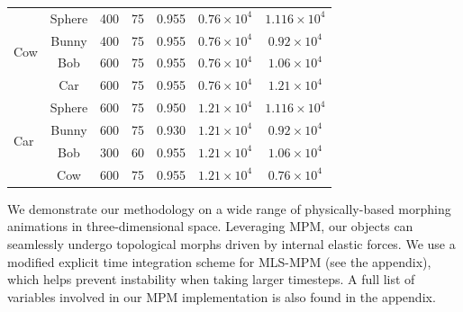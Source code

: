 \begin{table}[!ht]
\begin{tabular}{l c c c c c c}
    \midrule
    \multirow{4}{*}{Cow}
      & Sphere & 400 & 75 & 0.955 & $0.76 \times 10^4$ & $1.116 \times 10^4$ \\
      & Bunny  & 400 & 75 & 0.955 & $0.76 \times 10^4$ & $0.92 \times 10^4$ \\
      & Bob    & 600 & 75 & 0.955 & $0.76 \times 10^4$ & $1.06 \times 10^4$ \\
      & Car    & 600 & 75 & 0.955 & $0.76 \times 10^4$ & $1.21 \times 10^4$ \\
    \midrule
    \multirow{4}{*}{Car}
      & Sphere & 600 & 75 & 0.950 & $1.21 \times 10^4$ & $1.116 \times 10^4$ \\
      & Bunny  & 600 & 75 & 0.930 & $1.21 \times 10^4$ & $0.92 \times 10^4$ \\
      & Bob    & 300 & 60 & 0.955 & $1.21 \times 10^4$ & $1.06 \times 10^4$ \\
      & Cow   & 600 & 75 & 0.955 & $1.21 \times 10^4$ & $0.76 \times 10^4$ \\
    \bottomrule
    \end{tabular}
    \label{tab:params}
\end{table}




\label{sec:examples}

    We demonstrate our methodology on a wide range of physically-based morphing animations in three-dimensional space.
    Leveraging MPM, our objects can seamlessly undergo topological morphs driven by internal elastic forces.
    We use a modified explicit time integration scheme for {MLS-MPM} (see the appendix), which helps prevent instability when taking larger timesteps.
    A full list of variables involved in our {MPM} implementation is also found in the appendix. %
    


